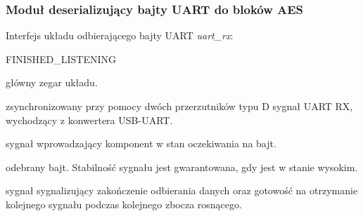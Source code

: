 \subsubsection{Moduł deserializujący bajty UART do bloków AES}
Interfejs układu odbierającego bajty UART \textit{uart\_rx}:
\begin{interface}{FINISHED\_LISTENING}
\item[\insignal{CLK\_16}] główny zegar układu.
\item[\insignal{RX}] zsynchronizowany przy pomocy dwóch przerzutników typu D sygnał UART RX, wychodzący z konwertera USB-UART.
\item[\insignal{START\_LISTENING}] sygnał wprowadzający komponent w stan oczekiwania na bajt.
\item[\outsignal{BYTE[7:0]}] odebrany bajt. Stabilność sygnału jest gwarantowana, gdy  jest w stanie wysokim.
\item[\outsignal{FINISHED\_LISTENING}] sygnał sygnalizujący zakończenie odbierania danych oraz gotowość na otrzymanie kolejnego sygnału  podczas kolejnego zbocza rosnącego.
\end{interface}
